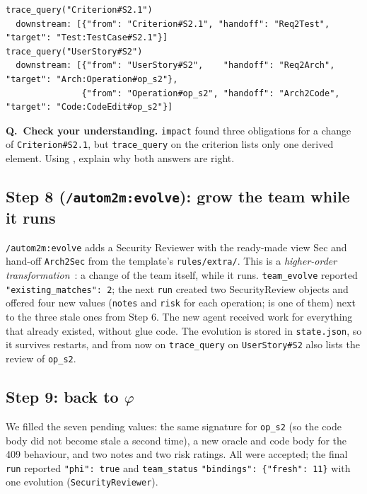 \documentclass[10pt,a4paper]{article}
\newcommand{\cls}[1]{\textsf{#1}}
\newcommand{\code}[1]{\texttt{#1}}
\newcommand{\file}[1]{\texttt{#1}}
\newcommand{\mcptool}[1]{\texttt{#1}}
\newcommand{\skill}[1]{\texttt{/autom2m:#1}}
\newcounter{think}
\newenvironment{think}[1][Check your understanding]{%
  \refstepcounter{think}%
  \begin{tcolorbox}[enhanced, breakable, colback=thinkbg, colframe=thinkbg, arc=0pt, boxrule=0pt,
     borderline west={2.2pt}{0pt}{thinkbar}, left=8pt, right=8pt, top=5pt, bottom=5pt,
     before skip=8pt, after skip=8pt]
  \textsf{\bfseries\color{thinkbar}Q\thethink.\ #1.}\enspace}{\end{tcolorbox}}
\begin{document}
\begin{lstlisting}[style=engine, caption={Observed: \code{trace\_query} for the criterion and for its story (abridged).}, label={lst:w1trace}]
trace_query("Criterion#S2.1")
  downstream: [{"from": "Criterion#S2.1", "handoff": "Req2Test", "target": "Test:TestCase#S2.1"}]
trace_query("UserStory#S2")
  downstream: [{"from": "UserStory#S2",    "handoff": "Req2Arch",  "target": "Arch:Operation#op_s2"},
               {"from": "Operation#op_s2", "handoff": "Arch2Code", "target": "Code:CodeEdit#op_s2"}]
\end{lstlisting}

\begin{think}
\mcptool{impact} found three obligations for a change of
\code{Criterion\#S2.1}, but \mcptool{trace\_query} on the criterion lists only
one derived element. Using , explain why both answers are
right.
\end{think}

\subsection{Step 8 (\skill{evolve}): grow the team while it runs}

\skill{evolve} adds a Security Reviewer with the ready-made view \cls{Sec}
and hand-off \code{Arch2Sec} from the template's \file{rules/extra/}. This is
a \emph{higher-order transformation}~\cite{tisi2009hot}: a change of the
team itself, while it runs. \mcptool{team\_evolve} reported
\code{"existing\_matches": 2}; the next \mcptool{run} created two
\cls{SecurityReview} objects and offered four new values (\code{notes} and
\code{risk} for each operation;  is one of them) next to
the three stale ones from Step 6. The new agent received work for everything
that already existed, without glue code. The evolution is stored in
\file{state.json}, so it survives restarts, and from now on
\mcptool{trace\_query} on \code{UserStory\#S2} also lists the review of
\code{op\_s2}.

\subsection{Step 9: back to $\varphi$}

We filled the seven pending values: the same signature for \code{op\_s2}
(so the code body did not become stale a second time), a new oracle and code body for the 409
behaviour, and two notes and two risk ratings. All were accepted; the final
\mcptool{run} reported \code{"phi": true} and \mcptool{team\_status}
\code{"bindings": \{"fresh": 11\}} with one evolution (\code{SecurityReviewer}).
\end{document}
